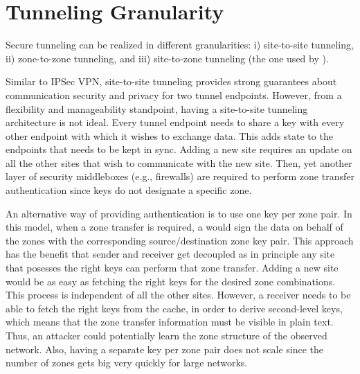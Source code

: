 \section{Tunneling Granularity} %
\label{sec:granularity}
Secure tunneling can be realized in different granularities: i) site-to-site tunneling,
ii) zone-to-zone tunneling, and iii) site-to-zone tunneling (the one used by \name).

Similar to IPSec VPN, site-to-site tunneling provides strong guarantees about
communication security and privacy for two tunnel endpoints. However, from a
flexibility and manageability standpoint, having a site-to-site tunneling
architecture is not ideal. Every tunnel endpoint needs to share a key with every
other endpoint with which it wishes to exchange data. This adds state to the
endpoints that needs to be kept in sync. Adding a new site requires an update on
all the other sites that wish to communicate with the new site. Then, yet
another layer of security middleboxes (e.g., firewalls) are required to perform
zone transfer authentication since keys do not designate a specific zone.

An alternative way of providing authentication is to use one key per zone pair.
In this model, when a zone transfer is required, a \tp would sign the data on
behalf of the zones with the corresponding source/destination zone key pair.
This approach has the benefit that sender and receiver get decoupled as in
principle any site that posesses the right keys can perform that zone transfer.
Adding a new site would be as easy as fetching the right keys for the desired
zone combinations. This process is independent of all the other sites. However,
a receiver \tp needs to be able to fetch the right keys from the cache, in order
to derive second-level keys, which means that the zone transfer information must
be visible in plain text. Thus, an attacker could potentially learn the zone
structure of the observed network. Also, having a separate key per zone pair
does not scale since the number of zones gets big very quickly for large
networks.

